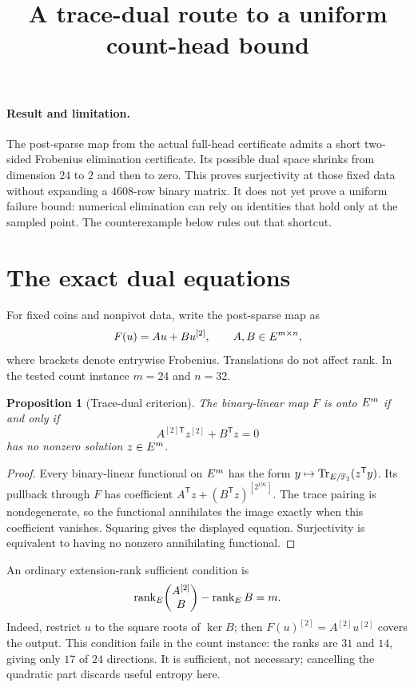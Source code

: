\documentclass[11pt]{article}
\title{A trace-dual route to a uniform count-head bound}
\author{}
\date{}
\newtheorem{proposition}{Proposition}
\begin{document}
\maketitle
\vspace{-2em}

\paragraph{Result and limitation.} The post-sparse map from the actual full-head certificate admits a short two-sided Frobenius elimination certificate. Its possible dual space shrinks from dimension $24$ to $2$ and then to zero. This proves surjectivity at those fixed data without expanding a $4608$-row binary matrix. It does not yet prove a uniform failure bound: numerical elimination can rely on identities that hold only at the sampled point. The counterexample below rules out that shortcut.

\section{The exact dual equations}

For fixed coins and nonpivot data, write the post-sparse map as
\[
 F(u)=Au+Bu^{[2]},\qquad A,B\in E^{m\times n},
\]
where brackets denote entrywise Frobenius. Translations do not affect rank. In the tested count instance $m=24$ and $n=32$.

\begin{proposition}[Trace-dual criterion]
The binary-linear map $F$ is onto $E^m$ if and only if
\[
 A^{[2]\mathsf T}z^{[2]}+B^{\mathsf T}z=0
\]
has no nonzero solution $z\in E^m$.
\end{proposition}
\begin{proof}
Every binary-linear functional on $E^m$ has the form $y\mapsto\operatorname{Tr}_{E/\mathbb{F}_2}(z^{\mathsf T}y)$. Its pullback through $F$ has coefficient $A^{\mathsf T}z+(B^{\mathsf T}z)^{[2^{191}]}$. The trace pairing is nondegenerate, so the functional annihilates the image exactly when this coefficient vanishes. Squaring gives the displayed equation. Surjectivity is equivalent to having no nonzero annihilating functional.
\end{proof}

An ordinary extension-rank sufficient condition is
\[
 \operatorname{rank}_{E}\!\begin{pmatrix}A^{[2]}\\B\end{pmatrix}
 -\operatorname{rank}_{E}B=m.
\]
Indeed, restrict $u$ to the square roots of $\ker B$; then $F(u)^{[2]}=A^{[2]}u^{[2]}$ covers the output. This condition fails in the count instance: the ranks are $31$ and $14$, giving only $17$ of $24$ directions. It is sufficient, not necessary; cancelling the quadratic part discards useful entropy here.
\end{document}
